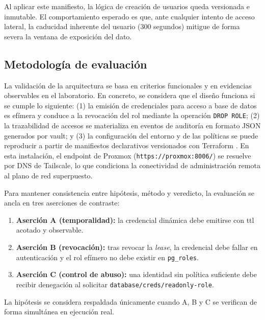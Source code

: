 \documentclass[runningheads]{llncs}
\begin{document}
% 

Al aplicar este manifiesto, la lógica de creación de usuarios queda versionada e inmutable. El comportamiento esperado es que, ante cualquier intento de acceso lateral, la caducidad inherente del usuario (300 segundos) mitigue de forma severa la ventana de exposición del dato.

\subsection{Metodología de evaluación}
La validación de la arquitectura se basa en criterios funcionales y en evidencias observables en el laboratorio. En concreto, se considera que el diseño funciona si se cumple lo siguiente: (1) la emisión de credenciales para acceso a base de datos es efímera y conduce a la revocación del rol mediante la operación \texttt{DROP ROLE}; (2) la trazabilidad de accesos se materializa en eventos de auditoría en formato JSON generados por \gls{vault}; y (3) la configuración del entorno y de las políticas se puede reproducir a partir de manifiestos declarativos versionados con Terraform \parencite{vault_database_secrets_engine,vault_audit_devices,terraform_documentation}. En esta instalación, el endpoint de Proxmox (\texttt{https://proxmox:8006/}) se resuelve por DNS de Tailscale, lo que condiciona la conectividad de administración remota al plano de red superpuesto.

Para mantener consistencia entre hipótesis, método y veredicto, la evaluación se ancla en tres aserciones de contraste:
\begin{enumerate}
    \item \textbf{Aserción A (temporalidad):} la credencial dinámica debe emitirse con \gls{ttl} acotado y observable.
    \item \textbf{Aserción B (revocación):} tras revocar la \textit{lease}, la credencial debe fallar en autenticación y el rol efímero no debe existir en \texttt{pg\_roles}.
    \item \textbf{Aserción C (control de abuso):} una identidad sin política suficiente debe recibir denegación al solicitar \texttt{database/creds/readonly-role}.
\end{enumerate}
La hipótesis se considera respaldada únicamente cuando A, B y C se verifican de forma simultánea en ejecución real.
\end{document}
